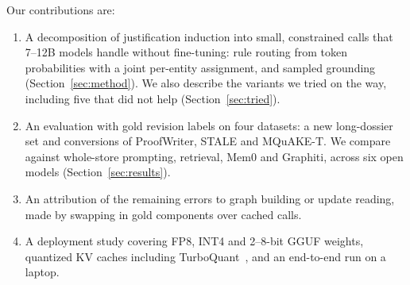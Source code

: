 \documentclass[conference]{IEEEtran}
\begin{document}
Our contributions are:
\begin{enumerate}
\item A decomposition of justification induction into small, constrained calls that 7--12B models handle without fine-tuning: rule routing from token probabilities with a joint per-entity assignment, and sampled grounding (Section~\ref{sec:method}). We also describe the variants we tried on the way, including five that did not help (Section~\ref{sec:tried}).
\item An evaluation with gold revision labels on four datasets: a new long-dossier set and conversions of ProofWriter, STALE and MQuAKE-T. We compare against whole-store prompting, retrieval, Mem0 and Graphiti, across six open models (Section~\ref{sec:results}).
\item An attribution of the remaining errors to graph building or update reading, made by swapping in gold components over cached calls.
\item A deployment study covering FP8, INT4 and 2--8-bit GGUF weights, quantized KV caches including TurboQuant~\cite{zandieh2026turboquant}, and an end-to-end run on a laptop.
\end{enumerate}
\end{document}
